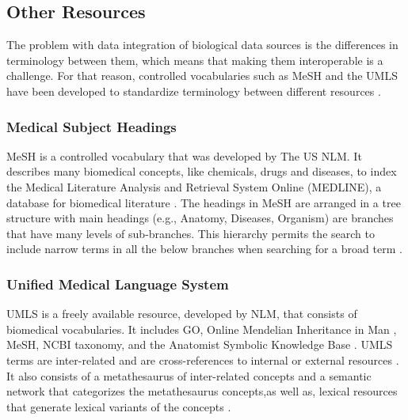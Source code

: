 \subsection{Other Resources}
The problem with data integration of biological data sources is the differences in terminology between them, which means that making them interoperable is a challenge. For that reason, controlled vocabularies such as \ac{MeSH} and the \ac{UMLS} have been developed to standardize terminology between different resources \cite{bodenreider_unified_2004}.

\subsubsection{Medical Subject Headings}
\ac{MeSH} is a controlled vocabulary that was developed by The US \ac{NLM}. It describes many biomedical concepts, like chemicals, drugs and diseases, to index the Medical Literature Analysis and Retrieval System Online (MEDLINE), a database for biomedical literature \cite{huang_recommending_2011}. The headings in \ac{MeSH} are arranged in a tree structure with main headings (e.g., Anatomy, Diseases, Organism) are branches that have many levels of sub-branches. This hierarchy permits the search to include narrow terms in all the below branches when searching for a broad term \cite{noauthor_introduction_nodate}.

\subsubsection{Unified Medical Language System}
\ac{UMLS} is a freely available resource, developed by \ac{NLM}, that consists of biomedical vocabularies. It includes \ac{GO}, Online Mendelian Inheritance in Man \cite{amberger_omim.org:_2015}, \ac{MeSH}, \ac{NCBI} taxonomy, and the Anatomist Symbolic Knowledge Base \cite{rosse_motivation_1998}. \ac{UMLS} terms are inter-related and are cross-references to internal or external resources \cite{bodenreider_unified_2004}. It also consists of a metathesaurus of inter-related concepts and a semantic network that categorizes the metathesaurus concepts,as well as, lexical resources that generate lexical variants of the concepts \cite{bodenreider_unified_2004}.


